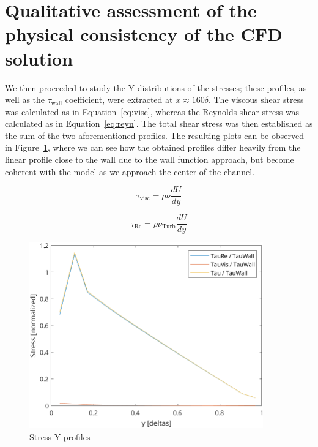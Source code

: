 \documentclass[12pt]{article}
\begin{document}
\section{Qualitative assessment of the physical consistency of the CFD solution} \label{sec:qualitative}

        We then proceeded to study the Y-distributions of the stresses; these profiles, as well as the \( \tau_{\text{wall}} \) coefficient, were extracted at \(x \approx 160 \delta\). The viscous shear stress was calculated as in Equation~\ref{eq:visc}, whereas the Reynolds shear stress was calculated as in Equation~\ref{eq:reyn}. The total shear stress was then established as the sum of the two aforementioned profiles. The resulting plots can be observed in Figure~\ref{fig:stress}, where we can see how the obtained profiles differ heavily from the linear profile close to the wall due to the wall function approach, but become coherent with the model as we approach the center of the channel.

        \begin{equation} \label{eq:visc}
                \tau_{\text{visc}} = \rho \nu \frac{dU}{dy}
        \end{equation}

        \begin{equation} \label{eq:reyn}
                \tau_{\text{Re}} = \rho \nu_\text{Turb} \frac{dU}{dy}
        \end{equation}

        \begin{figure}[ht!]
                \centering
                \includegraphics[width=0.9\textwidth]{stress.png}
                \caption{Stress Y-profiles}
                \label{fig:stress}
        \end{figure}
\end{document}
